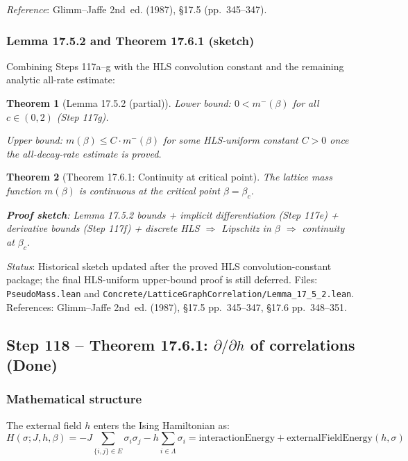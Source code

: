 \documentclass[a4paper,11pt]{article}
\newtheorem{theorem}{Theorem}
\begin{document}
\textit{Reference}: Glimm--Jaffe 2nd~ed. (1987), \S17.5 (pp.~345--347).

\subsubsection*{Lemma 17.5.2 and Theorem 17.6.1 (sketch)}

Combining Steps 117a--g with the HLS convolution constant and the remaining
analytic all-rate estimate:

\begin{theorem}[Lemma 17.5.2 (partial)]
Lower bound: $0 < m^-(\beta)$ for all $c \in (0, 2)$ (Step 117g).

Upper bound: $m(\beta) \le C \cdot m^-(\beta)$ for some HLS-uniform
constant $C > 0$ once the all-decay-rate estimate is proved.
\end{theorem}

\begin{theorem}[Theorem 17.6.1: Continuity at critical point]
The lattice mass function $m(\beta)$ is continuous at the critical point $\beta = \beta_c$.

\textbf{Proof sketch}: Lemma 17.5.2 bounds + implicit differentiation (Step 117e)
+ derivative bounds (Step 117f) + discrete HLS $\Rightarrow$ Lipschitz in $\beta$ $\Rightarrow$ continuity at $\beta_c$.
\end{theorem}

\noindent\textit{Status}: Historical sketch updated after the proved HLS
convolution-constant package; the final HLS-uniform upper-bound proof is still
deferred.
Files: \texttt{PseudoMass.lean} and
\texttt{Concrete/LatticeGraphCorrelation/Lemma\_17\_5\_2.lean}.
References: Glimm--Jaffe 2nd~ed. (1987), \S17.5 pp.~345--347, \S17.6 pp.~348--351.

\subsection*{Step 118 -- Theorem 17.6.1: $\partial/\partial h$ of correlations (Done)}

\subsubsection*{Mathematical structure}

The external field $h$ enters the Ising Hamiltonian as:
\[
  H(\sigma; J, h, \beta) = -J\sum_{\{i,j\} \in E} \sigma_i\sigma_j - h \sum_{i \in \Lambda} \sigma_i
  = \text{interactionEnergy} + \text{externalFieldEnergy}(h, \sigma)
\]
\end{document}

